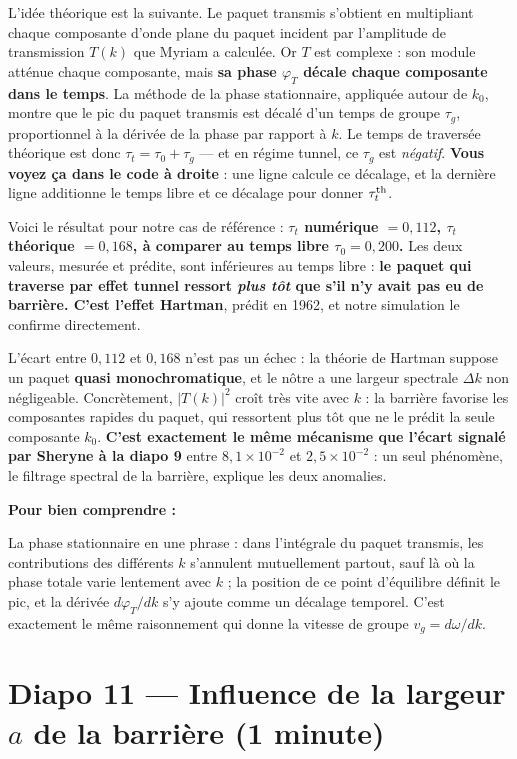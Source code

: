 \documentclass[11pt,a4paper]{article}
\newcommand{\diapo}[2]{\section*{Diapo #1 --- #2}}
\newenvironment{comprendre}%
{\par\medskip\noindent\hrulefill\par\nopagebreak\textbf{Pour bien comprendre :}\itshape\par}%
{\par\nopagebreak\noindent\hrulefill\par\medskip}
\begin{document}
	L'idée théorique est la suivante. Le paquet transmis s'obtient en multipliant
	chaque composante d'onde plane du paquet incident par l'amplitude de transmission
	$T(k)$ que Myriam a calculée. Or $T$ est complexe : son module atténue chaque
	composante, mais \textbf{sa phase $\varphi_T$ décale chaque composante dans le
		temps}. La méthode de la phase stationnaire, appliquée autour de $k_0$, montre
	que le pic du paquet transmis est décalé d'un temps de groupe $\tau_g$,
	proportionnel à la dérivée de la phase par rapport à $k$. Le temps de traversée
	théorique est donc $\tau_t = \tau_0 + \tau_g$ --- et en régime tunnel, ce
	$\tau_g$ est \emph{négatif}. \textbf{Vous voyez ça dans le code à droite} : une
	ligne calcule ce décalage, et la dernière ligne additionne le temps libre et
	ce décalage pour donner $\tau_t^{\rm th}$.
	
	Voici le résultat pour notre cas de référence :
	\textbf{$\tau_t$ numérique $= 0{,}112$, $\tau_t$ théorique $= 0{,}168$, à
		comparer au temps libre $\tau_0 = 0{,}200$.} Les deux valeurs, mesurée et
	prédite, sont inférieures au temps libre :
	\textbf{le paquet qui traverse par effet tunnel ressort \emph{plus tôt} que s'il
		n'y avait pas eu de barrière. C'est l'effet Hartman}, prédit en 1962, et notre
	simulation le confirme directement.
	
	L'écart entre $0{,}112$ et $0{,}168$ n'est pas un échec : la théorie de Hartman
	suppose un paquet \textbf{quasi monochromatique}, et le nôtre a une largeur
	spectrale $\Delta k$ non négligeable. Concrètement, $|T(k)|^2$ croît très vite
	avec $k$ : la barrière favorise les composantes rapides du paquet, qui
	ressortent plus tôt que ne le prédit la seule composante $k_0$.
	\textbf{C'est exactement le même mécanisme que l'écart signalé par Sheryne à
		la diapo 9} entre $8{,}1\times10^{-2}$ et $2{,}5\times10^{-2}$ : un seul
	phénomène, le filtrage spectral de la barrière, explique les deux anomalies.
	
	\begin{comprendre}
		La phase stationnaire en une phrase : dans l'intégrale du paquet transmis, les
		contributions des différents $k$ s'annulent mutuellement partout, sauf là où la
		phase totale varie lentement avec $k$ ; la position de ce point d'équilibre
		définit le pic, et la dérivée $d\varphi_T/dk$ s'y ajoute comme un décalage
		temporel. C'est exactement le même raisonnement qui donne la vitesse de groupe
		$v_g = d\omega/dk$.
	\end{comprendre}
	
	\diapo{11}{Influence de la largeur $a$ de la barrière (1 minute)}
	
\end{document}
